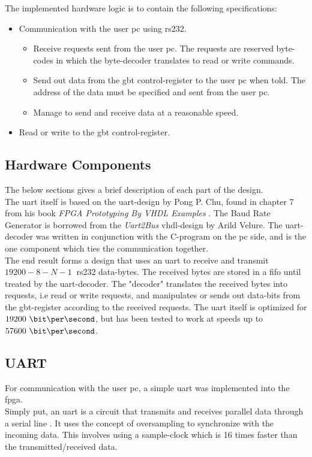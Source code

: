 \documentclass[main.tex]{subfiles}
\begin{document}
The implemented hardware logic is to contain the following specifications:\\
\begin{itemize} \setlength{\itemsep}{10pt}
\item Communication with the user \acrshort{pc} using \acrshort{rs232}.
  \begin{itemize}
  \item Receive requests sent from the user \acrshort{pc}. The requests are reserved byte-codes in which the byte-decoder translates to read or write commands. 
  \item Send out data from the \gls{gbt} control-register to the user \acrshort{pc} when told. The address of the data must be specified and sent from the user \acrshort{pc}.
  \item Manage to send and receive data at a reasonable speed. 
  \end{itemize}
\item Read or write to the \gls{gbt} control-register.
\end{itemize}

\subsection{Hardware Components}

The below sections gives a brief description of each part of the design.\\
The \gls{uart} itself is based on the \gls{uart}-design by Pong P. Chu, found in chapter 7 from his book \textit{FPGA Prototyping By VHDL Examples} \cite{chu08}. The Baud Rate Generator is borrowed from the \textit{Uart2Bus} \acrshort{vhdl}-design by Arild Velure. The \gls{uart}-decoder was written in conjunction with the C-program on the \acrshort{pc} side, and is the one component which ties the communication together.\\

The end result forms a design that uses an \gls{uart} to receive and transmit $19200-8-N-1~$ \acrshort{rs232} data-bytes. The received bytes are stored in a \gls{fifo} until treated by the \gls{uart}-decoder. The "decoder" translates the received bytes into requests, i.e read or write requests, and manipulates or sends out data-bits from the \gls{gbt}-register according to the received requests. The \gls{uart} itself is optimized for $19200~\bit\per\second$, but has been tested to work at speeds up to $57600~\bit\per\second$.

\subsection{UART}
For communication with the user \acrshort{pc}, a simple \gls{uart} was implemented into the \gls{fpga}.\\
Simply put, an \gls{uart} is a circuit that transmits and receives parallel data through a serial line \cite{chu08}. It uses the concept of oversampling to synchronize with the incoming data. This involves using a sample-clock which is 16 times faster than the transmitted/received data.\\
\end{document}

